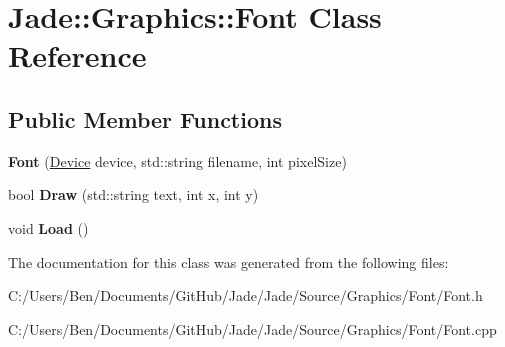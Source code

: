 \hypertarget{class_jade_1_1_graphics_1_1_font}{}\section{Jade\+:\+:Graphics\+:\+:Font Class Reference}
\label{class_jade_1_1_graphics_1_1_font}
\subsection*{Public Member Functions}
\begin{DoxyCompactItemize}
\item 
\hypertarget{class_jade_1_1_graphics_1_1_font_aa5c5a0acd6ad09ea9cedf09c5b52b23e}{}{\bfseries Font} (\hyperlink{class_jade_1_1_graphics_1_1_device}{Device} device, std\+::string filename, int pixel\+Size)\label{class_jade_1_1_graphics_1_1_font_aa5c5a0acd6ad09ea9cedf09c5b52b23e}

\item 
\hypertarget{class_jade_1_1_graphics_1_1_font_a1cb7fdd53a527a3e4a447f8c4f839368}{}bool {\bfseries Draw} (std\+::string text, int x, int y)\label{class_jade_1_1_graphics_1_1_font_a1cb7fdd53a527a3e4a447f8c4f839368}

\item 
\hypertarget{class_jade_1_1_graphics_1_1_font_aaf4c4b1356fb89ecb075f0cb53daa822}{}void {\bfseries Load} ()\label{class_jade_1_1_graphics_1_1_font_aaf4c4b1356fb89ecb075f0cb53daa822}

\end{DoxyCompactItemize}


The documentation for this class was generated from the following files\+:\begin{DoxyCompactItemize}
\item 
C\+:/\+Users/\+Ben/\+Documents/\+Git\+Hub/\+Jade/\+Jade/\+Source/\+Graphics/\+Font/Font.\+h\item 
C\+:/\+Users/\+Ben/\+Documents/\+Git\+Hub/\+Jade/\+Jade/\+Source/\+Graphics/\+Font/Font.\+cpp\end{DoxyCompactItemize}
